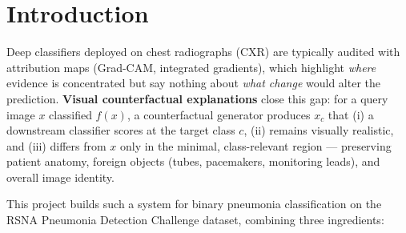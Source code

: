 \documentclass[11pt]{article}
\begin{document}
\begin{abstract}
Detection Challenge dataset, following Singla~\emph{et
al.}~\cite{singla2022}'s protocol, the system separately achieves a mean
CV of $0.940$ (n$\to$p: $0.980$, p$\to$n: $0.900$ at $\tau=0.8$), an
XRV-DenseNet FID of $20.02$ / $5.63$ against each direction's real target
class, and, on two clinical proxy metrics (Cardio-Thoracic Ratio,
Costophrenic-recess score), no significant shift in this evaluation run —
CTR's within-image delta is not distinguishable from zero ($p=0.69$/
$0.44$) and SCP's own computation flags itself as degenerate. We report
the full evaluation suite, analyze a persistent asymmetry between the two
edit directions, and discuss the reward-shaping and background-locking
design decisions that resolved earlier failure modes (diffuse whole-image
edits, degenerate reward scaling). Appendix~\ref{sec:breast} reports
exploratory, not-yet-validated work extending the same pipeline to a
second, dissimilar imaging domain (mammography, CBIS-DDSM).
\end{abstract}

\tableofcontents

\section{Introduction}

Deep classifiers deployed on chest radiographs (CXR) are typically audited
with attribution maps (Grad-CAM, integrated gradients), which highlight
\emph{where} evidence is concentrated but say nothing about \emph{what
change} would alter the prediction. \textbf{Visual counterfactual
explanations} close this gap: for a query image $x$ classified $f(x)$, a
counterfactual generator produces $x_c$ that (i) a downstream classifier
scores at the target class $c$, (ii) remains visually realistic, and (iii)
differs from $x$ only in the minimal, class-relevant region — preserving
patient anatomy, foreign objects (tubes, pacemakers, monitoring leads), and
overall image identity.

This project builds such a system for binary pneumonia classification on
the RSNA Pneumonia Detection Challenge dataset, combining three ingredients:
\end{document}
